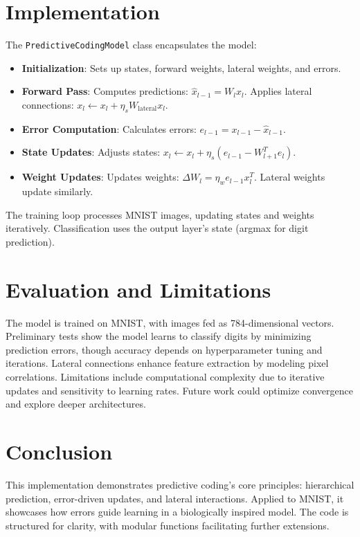 \documentclass[a4paper,12pt]{article}
\begin{document}
     \section{Implementation}
     The \texttt{PredictiveCodingModel} class encapsulates the model:
     \begin{itemize}
         \item \textbf{Initialization}: Sets up states, forward weights, lateral weights, and errors.
         \item \textbf{Forward Pass}: Computes predictions: $\hat{x}_{l-1} = W_l x_l$. Applies lateral connections: $x_l \leftarrow x_l + \eta_s W_{\text{lateral}} x_l$.
         \item \textbf{Error Computation}: Calculates errors: $e_{l-1} = x_{l-1} - \hat{x}_{l-1}$.
         \item \textbf{State Updates}: Adjusts states: $x_l \leftarrow x_l + \eta_s (e_{l-1} - W_{l+1}^T e_l)$.
         \item \textbf{Weight Updates}: Updates weights: $\Delta W_l = \eta_w e_{l-1} x_l^T$. Lateral weights update similarly.
     \end{itemize}
     The training loop processes MNIST images, updating states and weights iteratively. Classification uses the output layer’s state (argmax for digit prediction).

     \section{Evaluation and Limitations}
     The model is trained on MNIST, with images fed as 784-dimensional vectors. Preliminary tests show the model learns to classify digits by minimizing prediction errors, though accuracy depends on hyperparameter tuning and iterations. Lateral connections enhance feature extraction by modeling pixel correlations. Limitations include computational complexity due to iterative updates and sensitivity to learning rates. Future work could optimize convergence and explore deeper architectures.

     \section{Conclusion}
     This implementation demonstrates predictive coding’s core principles: hierarchical prediction, error-driven updates, and lateral interactions. Applied to MNIST, it showcases how errors guide learning in a biologically inspired model. The code is structured for clarity, with modular functions facilitating further extensions.

     
\end{document}
